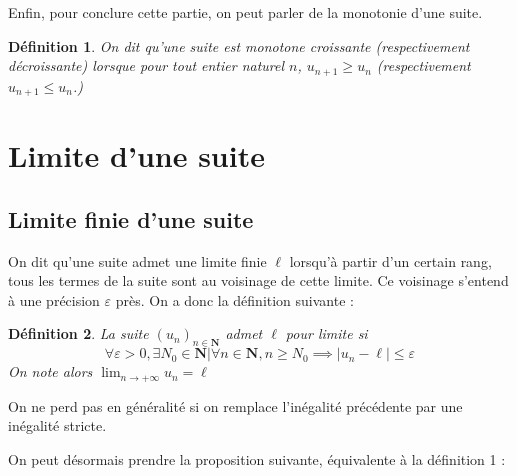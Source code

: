 \documentclass[12pt,a4paper]{article}
\newcommand{\N}{\mathbf{N}}
\newcommand{\vabs}[1]{\left\lvert #1 \right\rvert}
\theoremstyle{break}
\newtheorem{definition}{Définition}
\theoremstyle{plain}
\theoremstyle{nonumberplain}
\theoremstyle{nonumberbreak}
\begin{document}

Enfin, pour conclure cette partie, on peut parler de la monotonie d'une
suite.

\begin{definition}
  On dit qu'une suite est monotone croissante (respectivement
  décroissante) lorsque pour tout entier naturel $n$, $u_{n+1} \geq u_n$
  (respectivement $u_{n+1} \leq u_n$.)
\end{definition}

\section{Limite d'une suite}

\subsection{Limite finie d'une suite}

On dit qu'une suite admet une limite finie $\ell$ lorsqu'à partir d'un
certain rang, tous les termes de la suite sont au voisinage de cette
limite. Ce voisinage s'entend à une précision $\varepsilon$ près. On a
donc la définition suivante :
\begin{definition}
  La suite $(u_n)_{n\in\N}$ admet $\ell$ pour limite si \[ \forall
    \varepsilon > 0, \exists N_0\in\N | \forall n \in\N , n\geq N_0
  \implies \vabs{u_n - \ell} \leq \varepsilon \]
  On note alors $\lim_{n\to+\infty} u_n = \ell$
\end{definition}

On ne perd pas en généralité si on remplace l'inégalité précédente par
une inégalité stricte.


On peut désormais prendre la proposition suivante, équivalente à la
définition 1 :

\end{document}
